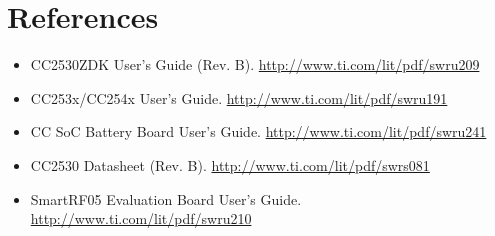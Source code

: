 \documentclass{article}
\begin{document}
\section*{References}

\begin{itemize}
  \item CC2530ZDK User's Guide (Rev. B). 
    \url{http://www.ti.com/lit/pdf/swru209}
  \item CC253x/CC254x User's Guide. \url{http://www.ti.com/lit/pdf/swru191}
  \item CC SoC Battery Board User's Guide. 
    \url{http://www.ti.com/lit/pdf/swru241}
  \item CC2530 Datasheet (Rev. B). \url{http://www.ti.com/lit/pdf/swrs081}
  \item SmartRF05 Evaluation Board User's Guide. 
    \url{http://www.ti.com/lit/pdf/swru210}
\end{itemize}
\end{document}
